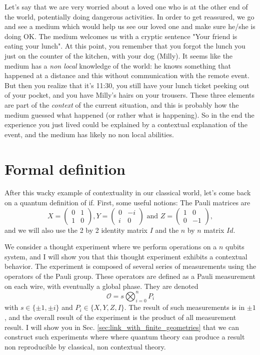 \documentclass{article}
\begin{document}
Let's say that we are very worried about a loved one who is at the other end of
the world, potentially doing dangerous activities. In order to get reassured, we
go and see a medium which would help us see our loved one and make sure he/she
is doing OK. The medium welcomes us with a cryptic sentence "Your friend is
eating your lunch". At this point, you remember that you forgot the lunch you
just on the counter of the kitchen, with your dog (Milly). It seems like the
medium has a \emph{non local} knowledge of the world: he knows something that
happened at a distance and this without communication with the remote event. But
then you realize that it's 11:30, you still have your lunch ticket peeking out
of your pocket, and you have Milly's hairs on your trousers. These three
elements are part of the \emph{context} of the current situation, and this is
probably how the medium guessed what happened (or rather what is happening). So
in the end the experience you just lived could be explained by a contextual
explanation of the event, and the medium has likely no non local abilities.

\section{Formal definition}
\label{sec:formal_definition}

After this wacky example of contextuality in our classical world, let's come back
on a quantum definition of if. First, some useful notions: The Pauli matrices are
$$X=\begin{pmatrix}
  0 & 1\\
  1 & 0
\end{pmatrix},Y=\begin{pmatrix}
  0 &  -i\\
  i & 0
\end{pmatrix} \text{ and } Z=\begin{pmatrix}
  1 & 0\\
  0 &-1
\end{pmatrix},$$
and we will also use the 2 by 2 identity matrix $I$ and the $n$ by $n$ matrix
$Id$.

We consider a thought experiment where we perform operations on a $n$ qubits
system, and I will show you that this thought experiment exhibits a contextual
behavior. The experiment is composed of several series of measurements using the
operators of the Pauli group. These operators are defined as a Pauli measurement
on each wire, with eventually a global phase. They are denoted
$$\mathcal{O} = s\bigotimes_{i=0}^n P_i$$
with $s\in\{\pm 1, \pm i\}$ and $P_i\in\{X,Y,Z,I\}$.
The result of such measurements is in $\pm 1$, and the overall result of the
experiment is the product of all measurement result. I will show you in Sec. 
\ref{sec:link_with_finite_geometries} that we can construct such experiments
where where quantum theory can produce a result non reproducible by classical,
non contextual theory.
\end{document}
